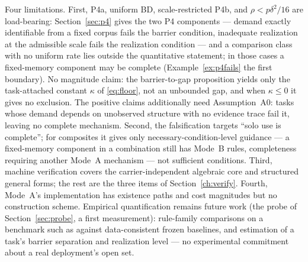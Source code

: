 Four limitations. First, P4a, uniform BD, scale-restricted P4b, and $\rho<p\delta^2/16$ are load-bearing: Section~\ref{sec:p4} gives the two P4 components --- demand exactly identifiable from a fixed corpus fails the barrier condition, inadequate realization at the admissible scale fails the realization condition --- and a comparison class with no uniform rate lies outside the quantitative statement; in those cases a fixed-memory component may be complete (Example~\ref{ex:p4fails} the first boundary). No magnitude claim: the barrier-to-gap proposition yields only the task-attached constant $\kappa$ of \eqref{eq:floor}, not an unbounded gap, and when $\kappa\le0$ it gives no exclusion. The positive claims additionally need Assumption~A0: tasks whose demand depends on unobserved structure with no evidence trace fail it, leaving no complete mechanism. Second, the falsification targets ``solo use is complete''; for composites it gives only necessary-condition-level guidance --- a fixed-memory component in a combination still has Mode~B rules, completeness requiring another Mode~A mechanism --- not sufficient conditions. Third, machine verification covers the carrier-independent algebraic core and structured general forms; the rest are the three items of Section~\ref{ch:verify}. Fourth, Mode~A's implementation has existence paths and cost magnitudes but no construction scheme. Empirical quantification remains future work (the probe of Section~\ref{sec:probe}, a first measurement): rule-family comparisons on a benchmark such as \citep{leuschner2021} against data-consistent frozen baselines, and estimation of a task's barrier separation and realization level --- no experimental commitment about a real deployment's open set.
